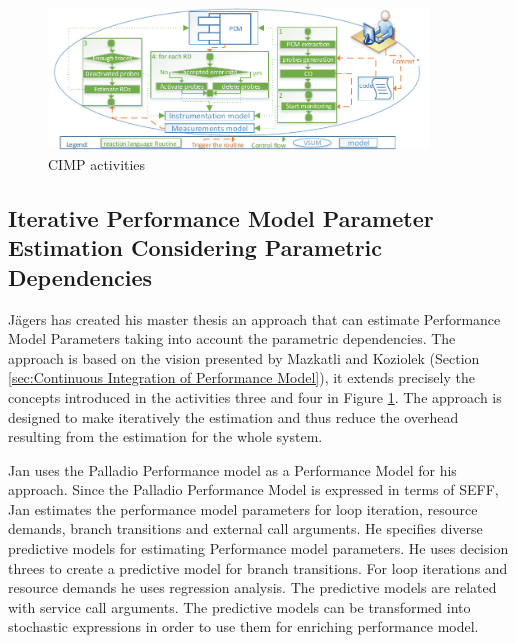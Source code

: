 \begin{figure}[h]
\centering
\includegraphics[width=0.9\textwidth]{figures/cipm}
\caption{CIMP activities \cite{mazkatli2018continuous}}
\label{fig:CIMP activities}
\end{figure} 

\subsection{Iterative Performance Model Parameter Estimation Considering Parametric Dependencies}
\label{sec:Iterative Performance Model Parameter Estimation Considering Parametric Dependencies}
Jägers has created his master thesis \cite{jagers2018Iterative} an approach that can estimate Performance Model Parameters taking into account the parametric dependencies. The approach is based on the vision presented by Mazkatli and Koziolek (Section \ref{sec:Continuous Integration of Performance Model}), it extends precisely the concepts introduced in the activities three and four in Figure \ref{fig:CIMP activities}. The approach is designed to make iteratively the estimation and thus reduce the overhead resulting from the estimation for the whole system. 

Jan uses the Palladio Performance model as a Performance Model for his approach. Since the Palladio Performance Model is expressed in terms of SEFF, Jan estimates the performance model parameters for loop iteration, resource demands, branch transitions and external call arguments. He specifies diverse predictive models for estimating Performance model parameters. He uses decision threes to create a predictive model for branch transitions. For loop iterations and resource demands he uses regression analysis. The predictive models are related with service call arguments. The predictive models can be transformed into stochastic expressions in order to use them for enriching performance model.

